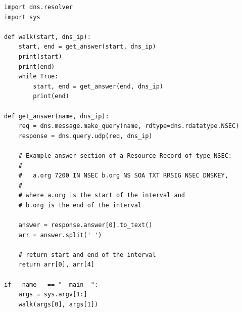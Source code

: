 \begin{lstlisting}
import dns.resolver
import sys

def walk(start, dns_ip):
    start, end = get_answer(start, dns_ip)
    print(start)
    print(end)
    while True:
        start, end = get_answer(end, dns_ip)
        print(end)

def get_answer(name, dns_ip):
    req = dns.message.make_query(name, rdtype=dns.rdatatype.NSEC)
    response = dns.query.udp(req, dns_ip)
    
    # Example answer section of a Resource Record of type NSEC:
    #
    #   a.org 7200 IN NSEC b.org NS SOA TXT RRSIG NSEC DNSKEY,
    #
    # where a.org is the start of the interval and
    # b.org is the end of the interval

    answer = response.answer[0].to_text()
    arr = answer.split(' ')
    
    # return start and end of the interval
    return arr[0], arr[4]

if __name__ == "__main__":
    args = sys.argv[1:]
    walk(args[0], args[1])
\end{lstlisting}
